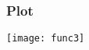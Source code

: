  \begin{frame}[fragile]\frametitle{Plot}
\begin{center}
\texttt{[image: func3]}
\end{center}
\end{frame}





